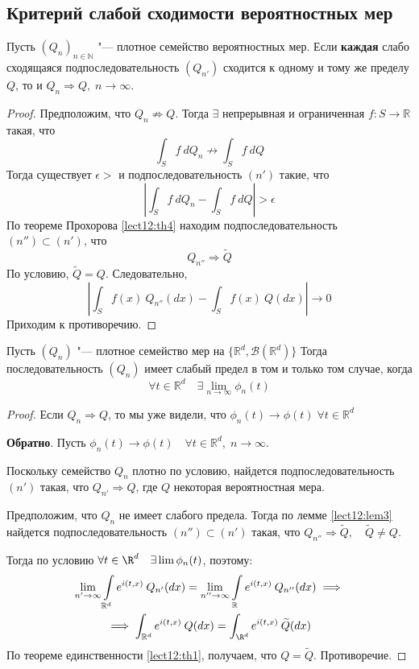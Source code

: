 \documentclass[a4paper,reqno]{amsart}
\begin{document}
\subsection{Критерий слабой сходимости вероятностных мер}
    \begin{lemma} \label{lect12:lem3}
        Пусть $(Q_n)_{n \in \mathbb{N}}$ "--- плотное семейство вероятностных мер. Если \textbf{каждая} слабо сходящаяся подпоследовательность $(Q_{n'})$ сходится к одному и тому же пределу $Q$, то и $Q_n \Rightarrow Q, \; n \to \infty$.
    \end{lemma}
    \begin{proof}
        Предположим, что $Q_n \not \Rightarrow Q$. Тогда $\exists$ непрерывная и ограниченная $f\colon S\to \mathbb{R}$ такая, что
        $$\int_S f \:dQ_n \not \to \int_S f \: dQ$$
        Тогда существует $\epsilon > $ и подпоследовательность $(n')$ такие, что
        $$\left| \int_S f\:dQ_n - \int_S f\: dQ\right| > \epsilon$$
        По теореме Прохорова \ref{lect12:th4} находим подпоследовательность $(n'') \subset (n')$, что
        $$Q_{n''} \Rightarrow \widetilde{Q}$$
        По условию, $\widetilde{Q} = Q$. Следовательно,
        $$\left|\int_S f(x) \:Q_{n''}(dx) - \int_S f(x)\:Q(dx) \right|\to 0$$
        Приходим к противоречию.
    \end{proof}
    \begin{lemma} \label{lect12:lem4}
        Пусть $(Q_n)$ "--- плотное семейство мер на $\{\mathbb{R}^d, \mathcal{B}(\mathbb{R}^d)\}$ Тогда последовательность $(Q_n)$ имеет слабый предел в том и только том случае, когда
        $$\forall t \in \mathbb{R}^d \quad\exists \lim_{n \to \infty} \phi_n(t)$$
    \end{lemma}
    \begin{proof}
        Если $Q_n \Rightarrow Q$, то мы уже видели, что $\phi_n(t) \to \phi(t)\; \forall t \in \mathbb{R}^d$

        \textbf{Обратно}. Пусть $\phi_n(t) \to \phi(t) \quad \forall t \in \mathbb{R}^d, \; n \to \infty$.

        Поскольку семейство $Q_n$ плотно по условию, найдется подпоследовательность $(n')$ такая, что $Q_{n'} \Rightarrow Q$, где $Q$ некоторая вероятностная мера.

        Предположим, что $Q_n$ не имеет слабого предела. Тогда по лемме \ref{lect12:lem3} найдется подпоследовательность $(n'')\subset (n')$ такая, что $Q_{n''} \Rightarrow\widetilde Q,\quad \widetilde Q \ne Q$.

        Тогда по условию $\forall t\in \R^d\quad \exists \lim \phi_n(t)$, поэтому:
        \begin{gather*}
            \lim_{n' \to \infty} \int\limits_{\mathbb{R}^d} e^{i(t,x)} \:Q_{n'}(dx) = \lim_{n'' \to \infty} \int\limits_\mathbb{R} e^{i(t,x)} \:Q_{n''}(dx) \implies\\
            \implies \int_{\mathbb{R}^d} e^{i(t, x)}\: Q(dx) = \int_{\R^d} e^{i(t,x)}\: \widetilde Q(dx)
        \end{gather*}
        По теореме единственности \ref{lect12:th1}, получаем, что $Q = \widetilde Q$. Противоречие.
    \end{proof}
\end{document}
